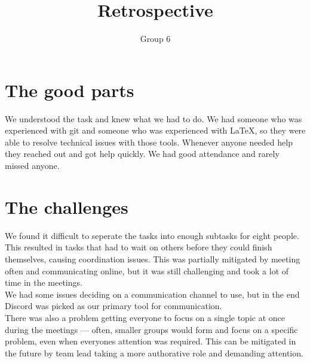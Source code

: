 \documentclass{article}
\title{Retrospective}
\author{Group 6}
\begin{document}
\maketitle

\section*{The good parts}

We understood the task and knew what we had to do. We had someone who was experienced with git and someone who was experienced with LaTeX, so they were able to resolve technical issues with those tools. Whenever anyone needed help they reached out and got help quickly. We had good attendance and rarely missed anyone.

\section*{The challenges}

We found it difficult to seperate the tasks into enough subtasks for eight people. This resulted in tasks that had to wait on others before they could finish themselves, causing coordination issues. This was partially mitigated by meeting often and communicating online, but it was still challenging and took a lot of time in the meetings. \\

\noindent We had some issues deciding on a communication channel to use, but in the end Discord was picked as our primary tool for communication. \\

\noindent There was also a problem getting everyone to focus on a single topic at once during the meetings --- often, smaller groups would form and focus on a specific problem, even when everyones attention was required. This can be mitigated in the future by team lead taking a more authorative role and demanding attention.
\end{document}
